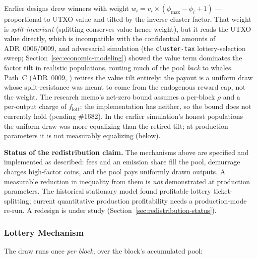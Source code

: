 Earlier designs drew winners with weight
$w_i = v_i \times (\phi_{\max} - \phi_i + 1)$ --- proportional to UTXO value
and tilted by the inverse cluster factor. That weight is \emph{split-invariant}
(splitting conserves value hence weight), but it reads the UTXO value directly,
which is incompatible with the confidential amounts of ADR~0006/0009, and
adversarial simulation (the \texttt{cluster-tax} lottery-selection sweep;
Section~\ref{sec:economic-modeling}) showed the value term dominates the
factor tilt in realistic populations, routing much of the pool
\emph{back} to whales. Path~C (ADR~0009,
) retires the value
tilt entirely: the payout is a uniform draw whose split-resistance was meant
to come from the endogenous reward cap, not the weight. The research memo's
net-zero bound assumes a per-block $\rho$ and a per-output charge of
$f_{\text{lott}}$; the implementation has neither, so the bound does not
currently hold (pending \#1682). In the earlier simulation's honest
populations the uniform draw was more equalizing than the retired tilt; at
production parameters it is not measurably equalizing (below).

\textbf{Status of the redistribution claim.} The mechanisms above are
specified and implemented as described: fees and an emission share fill the
pool, demurrage charges high-factor coins, and the pool pays uniformly drawn
outputs. A measurable reduction in inequality from them is \emph{not}
demonstrated at production parameters. The historical stationary model
found profitable lottery ticket-splitting; current quantitative production
profitability needs a production-mode re-run. A redesign is under study
(Section~\ref{sec:redistribution-status}).



\subsubsection{Lottery Mechanism}

The draw runs once \emph{per block}, over the block's accumulated pool:


